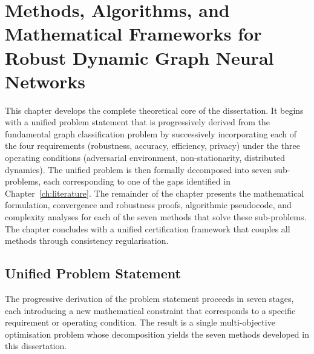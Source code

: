 
\chapter{Methods, Algorithms, and Mathematical Frameworks for Robust Dynamic Graph Neural Networks}
\label{ch:methods}

This chapter develops the complete theoretical core of the dissertation. It begins with a unified problem statement that is progressively derived from the fundamental graph classification problem by successively incorporating each of the four requirements (robustness, accuracy, efficiency, privacy) under the three operating conditions (adversarial environment, non-stationarity, distributed dynamics). The unified problem is then formally decomposed into seven sub-problems, each corresponding to one of the gaps identified in Chapter~\ref{ch:literature}. The remainder of the chapter presents the mathematical formulation, convergence and robustness proofs, algorithmic pseudocode, and complexity analyses for each of the seven methods that solve these sub-problems. The chapter concludes with a unified certification framework that couples all methods through consistency regularisation.


\section{Unified Problem Statement}
\label{sec:problem_statement}

The progressive derivation of the problem statement proceeds in seven stages, each introducing a new mathematical constraint that corresponds to a specific requirement or operating condition. The result is a single multi-objective optimisation problem whose decomposition yields the seven methods developed in this dissertation.


